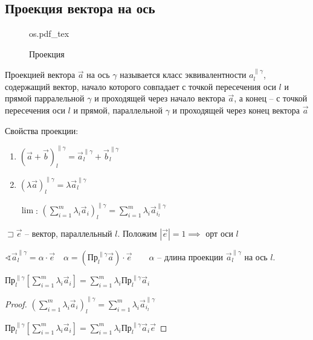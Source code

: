 \documentclass{book}
\theoremstyle{definition}
\newcommand{\incfig}[1]{%
    \def\svgwidth{\columnwidth}
    {#1.pdf_tex}
}
\begin{document}
        \subsection{Проекция вектора на ось}

\begin{figure}[ht]
    \centering
    \incfig{os}
    \caption{Проекция}
    \label{fig:os}
\end{figure}


\begin{definition}
    Проекцией вектора $\vec a$ на ось  $\gamma$ называется класс эквивалентности $a_l^{\parallel \gamma}$, содержащий вектор, начало которого совпадает с точкой пересечения оси  $l$ и прямой парралельной $\gamma$ и проходящей через начало вектора $\vec a$, а конец -- с точкой пересечения оси $l$ и прямой, параллельной  $\gamma$ и проходящей через конец вектора  $\vec a$
\end{definition}

Свойства проекции:
\begin{enumerate}
    \item $(\vec a + \vec b)_l^{\parallel \gamma} = \vec a_l^{\parallel \gamma} + \vec b_l^{\parallel \gamma}$
    \item  $(\lambda \vec a)_l^{\parallel \gamma} = \lambda \vec a_l^{\parallel \gamma}$
    \item [\underline{$\lim$}:]  $\left( \sum\limits_{i=1}^{m} \lambda_i\vec a_i \right)_l^{\parallel \gamma} = \sum\limits_{i=1}^{m} \lambda_i \vec a_{i_l}^{\parallel \gamma} $

\end{enumerate}

$\sqsupset \vec e$ -- вектор, параллельный $l$. Положим  $\left| \vec e \right| = 1 \implies  $ орт оси $l$

$\sphericalangle \vec a_l^{\parallel \gamma} = \alpha \cdot \vec e\quad \alpha = (\text{Пр}_l^{\parallel \gamma}\vec a) \cdot  \vec e\qquad \alpha$ -- длина проекции $\vec a_l^{\parallel \gamma}$ на ось  $l$.

\begin{lemma}
$\text{Пр}_l^{\parallel \gamma} \left[ \sum_{i=1}^{m} \lambda_i \vec a_i \right] = \sum_{i=1}^{m} \lambda_i \text{Пр}_l^{\parallel \gamma} \vec a_i$
\end{lemma}
\begin{proof}
    $\left( \sum_{i=1}^{m} \lambda_i \vec a_i \right) _l^{\parallel \gamma} = \sum_{i=1}^{m} \lambda_i \vec a_{i_l}^{\parallel \gamma}$

    $\text{Пр}_l^{\parallel \gamma}\left[\sum_{i=1}^{m} \lambda_i \vec a_i\right] = \sum_{i=1}^{m} \lambda _i \text{Пр}_l^{\parallel \gamma} \vec a_i \vec e $
\end{proof}
\end{document}
